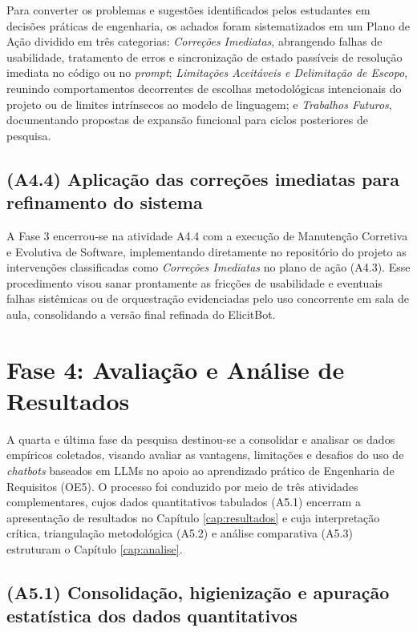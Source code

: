 Para converter os problemas e sugestões identificados pelos estudantes em decisões práticas de engenharia, os achados foram sistematizados em um Plano de Ação dividido em três categorias: \textit{Correções Imediatas}, abrangendo falhas de usabilidade, tratamento de erros e sincronização de estado passíveis de resolução imediata no código ou no \textit{prompt}; \textit{Limitações Aceitáveis e Delimitação de Escopo}, reunindo comportamentos decorrentes de escolhas metodológicas intencionais do projeto ou de limites intrínsecos ao modelo de linguagem; e \textit{Trabalhos Futuros}, documentando propostas de expansão funcional para ciclos posteriores de pesquisa.

\subsection{(A4.4) Aplicação das correções imediatas para refinamento do sistema}

A Fase 3 encerrou-se na atividade A4.4 com a execução de Manutenção Corretiva e Evolutiva de Software, implementando diretamente no repositório do projeto as intervenções classificadas como \textit{Correções Imediatas} no plano de ação (A4.3). Esse procedimento visou sanar prontamente as fricções de usabilidade e eventuais falhas sistêmicas ou de orquestração evidenciadas pelo uso concorrente em sala de aula, consolidando a versão final refinada do ElicitBot.

\section{Fase 4: Avaliação e Análise de Resultados}
\label{sec:fase4}

A quarta e última fase da pesquisa destinou-se a consolidar e analisar os dados empíricos coletados, visando avaliar as vantagens, limitações e desafios do uso de \textit{chatbots} baseados em LLMs no apoio ao aprendizado prático de Engenharia de Requisitos (OE5). O processo foi conduzido por meio de três atividades complementares, cujos dados quantitativos tabulados (A5.1) encerram a apresentação de resultados no Capítulo \ref{cap:resultados} e cuja interpretação crítica, triangulação metodológica (A5.2) e análise comparativa (A5.3) estruturam o Capítulo \ref{cap:analise}.

\subsection{(A5.1) Consolidação, higienização e apuração estatística dos dados quantitativos}

